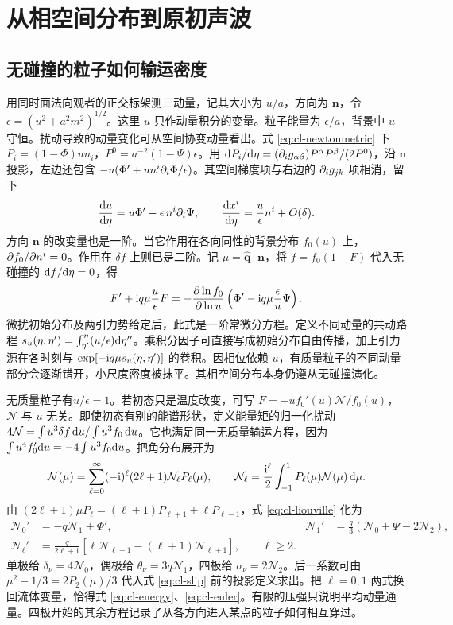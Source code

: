 \section{从相空间分布到原初声波}\label{sec:cosmo-radiation-perturb}

\subsection{无碰撞的粒子如何输运密度}

用同时面法向观者的正交标架测三动量，记其大小为 $u/a$，方向为 $\bm n$，令 $\epsilon=(u^2+a^2m^2)^{1/2}$。这里 $u$ 只作动量积分的变量。粒子能量为 $\epsilon/a$，背景中 $u$ 守恒。扰动导致的动量变化可从空间协变动量看出。式 \eqref{eq:cl-newtonmetric} 下 $P_i=(1-\Phi)u n_i$，$P^0=a^{-2}(1-\Psi)\epsilon$。用 $\dd P_i/\dd\eta=(\partial_i g_{\alpha\beta})P^\alpha P^\beta/(2P^0)$，沿 $\bm n$ 投影，左边还包含 $-u(\Phi'+u n^i\partial_i\Phi/\epsilon)$。其空间梯度项与右边的 $\partial_i g_{jk}$ 项相消，留下
\[
 \frac{\dd u}{\dd\eta}=u\Phi'-\epsilon\,n^i\partial_i\Psi,\qquad
 \frac{\dd x^i}{\dd\eta}=\frac{u}{\epsilon}n^i+O(\delta).
\]
方向 $\bm n$ 的改变量也是一阶。当它作用在各向同性的背景分布 $f_0(u)$ 上，$\partial f_0/\partial n^i=0$。作用在 $\delta f$ 上则已是二阶。记 $\mu=\hat{\bm q}\cdot\bm n$，将 $f=f_0(1+F)$ 代入无碰撞的 $\dd f/\dd\eta=0$，得
\begin{equation}\label{eq:cl-liouville}
 F'+\mathrm{i} q\mu\frac{u}{\epsilon}F
 =-\frac{\partial\ln f_0}{\partial\ln u}
       \left(\Phi'-\mathrm{i} q\mu\frac{\epsilon}{u}\Psi\right).
\end{equation}
微扰初始分布及两引力势给定后，此式是一阶常微分方程。定义不同动量的共动路程 $s_u(\eta,\eta')=\int_{\eta'}^\eta (u/\epsilon)\dd\eta''$。乘积分因子可直接写成初始分布自由传播，加上引力源在各时刻与 $\exp[-\mathrm{i} q\mu s_u(\eta,\eta')]$ 的卷积。因相位依赖 $u$，有质量粒子的不同动量部分会逐渐错开，小尺度密度被抹平。其相空间分布本身仍遵从无碰撞演化。

无质量粒子有$u/\epsilon=1$。若初态只是温度改变，可写 $F=-u f_0'(u)\mathcal N/f_0(u)$，$\mathcal N$ 与 $u$ 无关。即使初态有别的能谱形状，定义能量矩的归一化扰动 $4\mathcal N=\int u^3\delta f\,\dd u/\int u^3f_0\,\dd u$。它也满足同一无质量输运方程，因为 $\int u^4 f_0'\dd u=-4\int u^3 f_0\dd u$。把角分布展开为
\[
 \mathcal N(\mu)=\sum_{\ell=0}^{\infty}(-\mathrm{i})^\ell(2\ell+1)
       \mathcal N_\ell P_\ell(\mu),\qquad
 \mathcal N_\ell=\frac{\mathrm{i}^\ell}{2}\int_{-1}^1P_\ell(\mu)\mathcal N(\mu)\,\dd\mu .
\]
由 $(2\ell+1)\mu P_\ell=(\ell+1)P_{\ell+1}+\ell P_{\ell-1}$，式 \eqref{eq:cl-liouville} 化为
\begin{align}
 \mathcal N_0'&=-q\mathcal N_1+\Phi',&
 \mathcal N_1'&=\frac q3(\mathcal N_0+\Psi-2\mathcal N_2),\label{eq:cl-nuhier}\\
 \mathcal N_\ell'&=\frac{q}{2\ell+1}
       [\ell\mathcal N_{\ell-1}-(\ell+1)\mathcal N_{\ell+1}],\qquad \ell\ge2 .
 \nonumber
\end{align}
单极给 $\delta_\nu=4\mathcal N_0$，偶极给 $\theta_\nu=3q\mathcal N_1$，四极给 $\sigma_\nu=2\mathcal N_2$。后一系数可由 $\mu^2-1/3=2P_2(\mu)/3$ 代入式 \eqref{eq:cl-slip} 前的投影定义求出。把 $\ell=0,1$ 两式换回流体变量，恰得式 \eqref{eq:cl-energy}、\eqref{eq:cl-euler}。有限的压强只说明平均动量通量。四极开始的其余方程记录了从各方向进入某点的粒子如何相互穿过。

